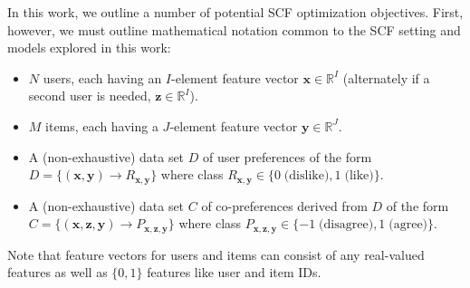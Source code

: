 \documentclass{sig-alternate}
\newcommand{\R}{\mathbb{R}}
\newcommand{\x}{\vec{x}}
\newcommand{\y}{\vec{y}}
\newcommand{\z}{\vec{z}}
\renewcommand{\vec}[1]{\mathbf{#1}}
\begin{document}
In this work, we outline a number of potential SCF optimization
objectives.  First, however, we must outline mathematical notation
common to the SCF setting and models explored in this work:
\begin{itemize}
\item $N$ users, each having an $I$-element feature vector 
$\x \in \R^I$ (alternately if a second user is needed, $\z \in \R^I$).
\item $M$ items, each having a $J$-element feature vector 
$\y \in \R^J$.
\item A (non-exhaustive) data set $D$ of user preferences of the form
$D = \{ (\x, \y) \to R_{\x,\y} \}$ where class 
$R_{\x,\y} \in \{ 0 \; \mbox{(dislike)}, 1 \; \mbox{(like)} \}$.
\item A (non-exhaustive) data set $C$ of co-preferences derived from $D$ of the form
$C = \{ (\x, \z, \y) \to P_{\x, \z, \y} \}$ where class 
$P_{\x, \z, \y} \in \{ -1 \; \mbox{(disagree)}, 1 \;\mbox{(agree)} \}$.  
\end{itemize}
Note that feature vectors for users 
and items can consist of any real-valued features as well as $\{0,1\}$
features like user and item IDs.
\end{document}
